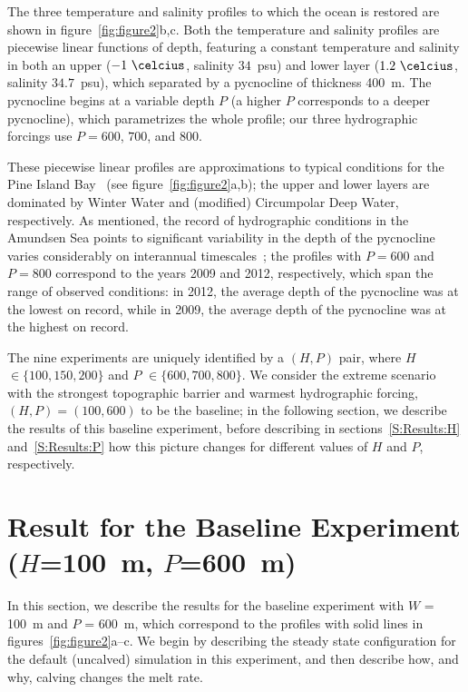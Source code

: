 \documentclass[draft]{agujournal2019}
\begin{document}
The three temperature and salinity profiles to which the ocean is restored are shown in figure~\ref{fig:figure2}b,c. Both the temperature and salinity profiles are piecewise linear functions of depth, featuring a constant temperature and salinity in both an upper ($-1~\si{\celcius}$, salinity $34$~psu) and lower layer ($1.2~\si{\celcius}$, salinity $34.7$~psu), which separated by a pycnocline of thickness 400~m. The pycnocline begins at a variable depth $P$ (a higher $P$ corresponds to a deeper pycnocline), which parametrizes the whole profile; our three hydrographic forcings use $P = 600$, $700$, and $800$. 

These piecewise linear profiles are approximations to typical conditions for the Pine Island Bay~\cite{Jacobs1996GRL, Dutrieux2014Science, Jenkins2018NatureGeo} (see figure~\ref{fig:figure2}a,b); the upper and lower layers are dominated by Winter Water and (modified) Circumpolar Deep Water, respectively. As mentioned, the record of hydrographic conditions in the Amundsen Sea points to significant variability in the depth of the pycnocline varies considerably on interannual timescales~\cite{Dutrieux2014Science}; the profiles with $P = 600$ and $P = 800$ correspond to the years 2009 and 2012, respectively, which span the range of observed conditions: in 2012, the average depth of the pycnocline was at the lowest on record, while in 2009, the average depth of the pycnocline was at the highest on record. 

The nine experiments are uniquely identified by a $(H,P)$ pair, where $H$ $\in \{100, 150, 200\}$ and $P$ $\in \{600, 700, 800\}$. We consider the extreme scenario with the strongest topographic barrier and warmest hydrographic forcing, $(H,P) = (100,600)$ to be the baseline; in the following section, we describe the results of this baseline experiment, before describing in sections~\ref{S:Results:H} and~\ref{S:Results:P} how this picture changes for different values of $H$ and $P$, respectively.

\section{Result for the Baseline Experiment ($H$=100~m, $P$=600~m)}\label{S:Baseline}
In this section, we describe the results for the baseline experiment with $W$ = 100~m and $P$ = 600~m, which correspond to the profiles with solid lines in figures~\ref{fig:figure2}a--c. We begin by describing the steady state configuration for the default (uncalved) simulation in this experiment, and then describe how, and why, calving changes the melt rate.
\end{document}
